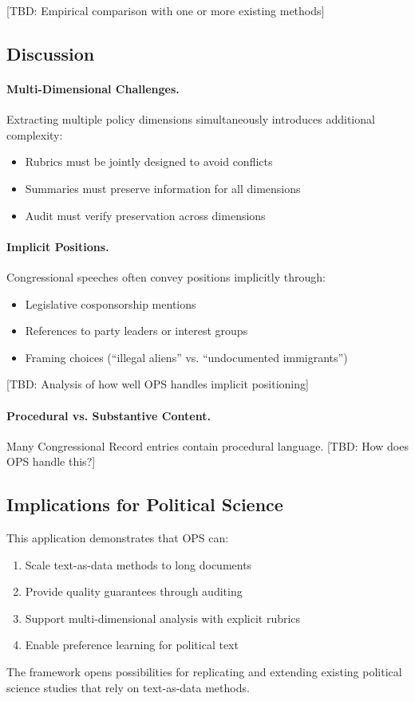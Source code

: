 [TBD: Empirical comparison with one or more existing methods]

\subsection{Discussion}

\paragraph{Multi-Dimensional Challenges.}
Extracting multiple policy dimensions simultaneously introduces additional complexity:
\begin{itemize}[nosep]
    \item Rubrics must be jointly designed to avoid conflicts
    \item Summaries must preserve information for all dimensions
    \item Audit must verify preservation across dimensions
\end{itemize}

\paragraph{Implicit Positions.}
Congressional speeches often convey positions implicitly through:
\begin{itemize}[nosep]
    \item Legislative cosponsorship mentions
    \item References to party leaders or interest groups
    \item Framing choices (``illegal aliens'' vs. ``undocumented immigrants'')
\end{itemize}

[TBD: Analysis of how well OPS handles implicit positioning]

\paragraph{Procedural vs. Substantive Content.}
Many Congressional Record entries contain procedural language. [TBD: How does OPS handle this?]

\subsection{Implications for Political Science}

This application demonstrates that OPS can:
\begin{enumerate}[nosep]
    \item Scale text-as-data methods to long documents
    \item Provide quality guarantees through auditing
    \item Support multi-dimensional analysis with explicit rubrics
    \item Enable preference learning for political text
\end{enumerate}

The framework opens possibilities for replicating and extending existing political science studies that rely on text-as-data methods.
